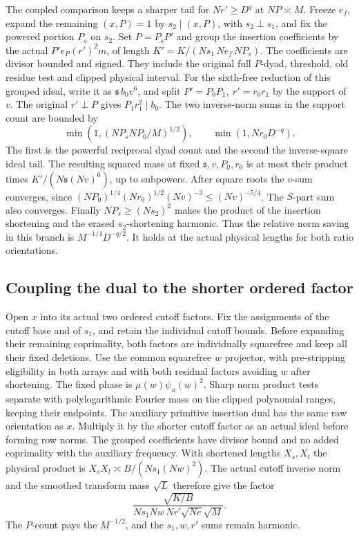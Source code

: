 The coupled comparison keeps a sharper tail for \(Nr'\ge D^q\)
at \(NP\asymp M\). Freeze \(e_f\), expand the remaining
\((x,P)=1\) by \(s_2\mid(x,P)\), with \(s_2\perp s_1\),
and fix the powered portion \(P_s\) on \(s_2\). Set \(P=P_sP'\)
and group the insertion coefficients by the actual
\(P'e_P(r')^2m\), of length \(K'=K/(Ns_1\,Ne_f\,NP_s)\).
The coefficients are divisor bounded and signed. They include
the original full \(P\)-dyad, threshold, old residue test and
clipped physical interval. For the sixth-free reduction of
this grouped ideal, write it as \(\mathfrak s\,b_0v^6\),
and split \(P'=P_0P_1,\ r'=r_0r_1\) by the support of \(v\).
The original \(r'\perp P\) gives \(P_1r_1^2\mid b_0\).
The two inverse-norm sums in the support count are bounded by
\[
 \min(1,(NP_sNP_0/M)^{1/2}),\qquad
 \min(1,Nr_0D^{-q}).
\]
The first is the powerful reciprocal dyad count and the
second the inverse-square ideal tail. The resulting squared
mass at fixed \(\mathfrak s,v,P_0,r_0\) is at most their
product times \(K'/(N\mathfrak s(Nv)^6)\), up to subpowers.
After square roots the \(v\)-sum converges, since
\((NP_0)^{1/4}(Nr_0)^{1/2}(Nv)^{-3}\le(Nv)^{-5/4}\).
The \(S\)-part sum also converges. Finally
\(NP_s\ge(Ns_2)^2\) makes the product of the insertion
shortening and the erased \(s_2\)-shortening harmonic.
Thus the relative norm saving in this branch is
\(M^{-1/4}D^{-q/2}\). It holds at the actual physical
lengths for both ratio orientations.

\subsection{Coupling the dual to the shorter ordered factor}
\label{pca:detail-coupling}

Open \(x\) into its actual two ordered cutoff factors.
Fix the assignments of the cutoff base and of \(s_1\), and
retain the individual cutoff bounds. Before expanding their
remaining coprimality, both factors are individually squarefree
and keep all their fixed deletions. Use the common squarefree
\(w\) projector, with pre-stripping eligibility in both arrays
and with both residual factors avoiding \(w\) after shortening.
The fixed phase is \(\mu(w)\psi_u(w)^2\). Sharp norm product
tests separate with polylogarithmic Fourier mass on the clipped
polynomial ranges, keeping their endpoints. The auxiliary
primitive insertion dual has the same raw orientation as \(x\).
Multiply it by the shorter cutoff factor as an actual ideal
before forming row norms. The grouped coefficients have
divisor bound and no added coprimality with the auxiliary
frequency. With shortened lengths \(X_s,X_l\) the physical
product is \(X_sX_l\asymp B/(Ns_1(Nw)^2)\).
The actual cutoff inverse norm and the smoothed transform
mass \(\sqrt L\) therefore give the factor
\[
 \frac{\sqrt{K/B}}{Ns_1 Nw\,Nr'\sqrt{Ne}\sqrt M}.
\]
The \(P\)-count pays the \(M^{-1/2}\), and the \(s_1,w,r'\)
sums remain harmonic.

